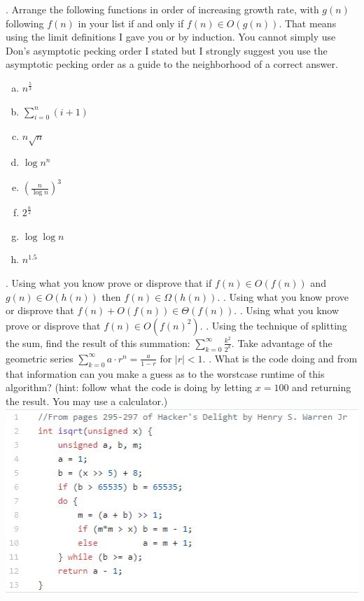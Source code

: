 \documentclass[12pt]{article}
\begin{document}
\newpage
{}. Arrange the following functions in order of increasing growth rate, with $g(n)$ following $f(n)$ in your list if and only if $f(n) \in O(g(n))$. That means using the limit definitions I gave you or by induction. You cannot simply use Don's asymptotic pecking order I stated but I strongly suggest you use the asymptotic pecking order as a guide to the neighborhood of a correct answer.\\
\begin{enumerate}[a)]
\item  $n^{\frac{5}{3}}$\\
\item $\sum\limits_{i = 0}^{n} (i + 1)$\\
\item $n\sqrt{n}$\\
\item $\log{n^n}$\\
\item $(\frac{n}{\log{n}})^3$\\
\item  $2^{\frac{n}{2}}$\\
\item  $\log{\log{n}}$\\
\item  $n^{1.5}$\\
\end{enumerate}
\newpage
{}. Using what you know prove or disprove that  if $f(n) \in O(f(n)) $ and $g(n) \in O(h(n))$ then $f(n) \in \Omega(h(n))$.
\newpage
{}. Using what you know prove or disprove that $f(n) + O(f(n)) \in \Theta(f(n))$.
\newpage
{}. Using what you know prove or disprove that $f(n)\in O(f(n)^2)$.
\newpage
{}. Using the technique of splitting the sum, find the result of this summation: $\sum\limits_{k=0}^{\infty}{\frac{k^2}{2^k}}$. Take advantage of the geometric series $\sum\limits_{k=0}^{\infty}{a \cdot r^n} = \frac{a}{1-r}$ for $|r| < 1$.
\newpage
{}. What is the code doing and from that information can you make a guess as to the worstcase runtime of this algorithm? (hint: follow what the code is doing by letting $x = 100$ and returning the result. You may use a calculator.)\\
\includegraphics[width=\linewidth]{isqrt.jpg} 
\end{document}
